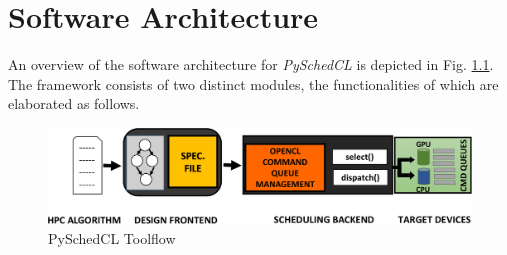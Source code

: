 
\chapter{Software Architecture} %

\label{Chapter4} %


An overview of the software architecture for {\em PySchedCL} is depicted in Fig. \ref{fig:pyschedcl}. The framework consists of two distinct modules, the functionalities of which are elaborated as follows.
	\begin{figure}[ht]  
		\centering
		\includegraphics[scale=0.35]{Pictures/TCOverviewNonML.pdf}
		\caption{PySchedCL Toolflow\label{fig:pyschedcl}}
	\end{figure}
